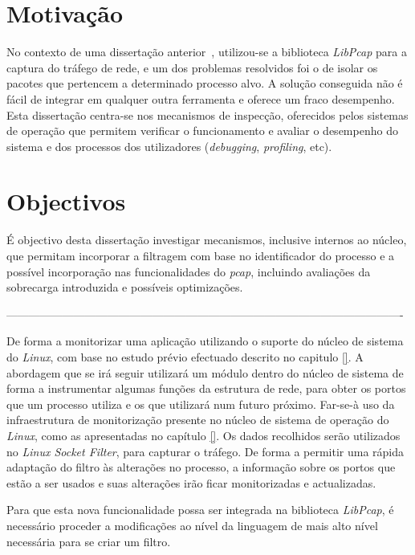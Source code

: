 \section{Motivação}
\label{sub:intro_motivation}

No contexto de uma dissertação anterior~\cite{Farruca:2009}, utilizou-se a biblioteca \textit{LibPcap} para a captura do tráfego de rede, e um dos problemas resolvidos foi o de isolar os pacotes que pertencem a determinado processo alvo.
A solução conseguida não é fácil de integrar em qualquer outra ferramenta e oferece um fraco desempenho.
Esta dissertação centra-se nos mecanismos de inspecção, oferecidos pelos sistemas de operação que permitem verificar o funcionamento e avaliar o desempenho do sistema e dos processos dos utilizadores (\textit{debugging}, \textit{profiling}, etc).



\section{Objectivos}
\label{sec:intro_goals}

É objectivo desta dissertação investigar mecanismos, inclusive internos ao núcleo, que permitam incorporar a filtragem com base no identificador do processo e a possível incorporação nas funcionalidades do \textit{pcap}, incluindo avaliações da sobrecarga introduzida e possíveis optimizações.

----------------------------------------------------------------------------------------------------------

De forma a monitorizar uma aplicação utilizando o suporte do núcleo de sistema do \textit{Linux}, com base no estudo prévio efectuado descrito no capitulo \ref{}.
A abordagem que se irá seguir utilizará um módulo dentro do núcleo de sistema de forma a instrumentar algumas funções da estrutura de rede, para obter os portos que um processo utiliza e os que utilizará num futuro próximo.
Far-se-à uso da infraestrutura de monitorização presente no núcleo de sistema de operação do \textit{Linux}, como as apresentadas no capítulo \ref{}.
Os dados recolhidos serão utilizados no \textit{Linux Socket Filter}, para capturar o tráfego.
De forma a permitir uma rápida adaptação do filtro às alterações no processo, a informação sobre os portos que estão a ser usados e suas alterações irão ficar monitorizadas e actualizadas.

Para que esta nova funcionalidade possa ser integrada na biblioteca \textit{LibPcap}, é necessário proceder a modificações ao nível da linguagem de mais alto nível necessária para se criar um filtro.


